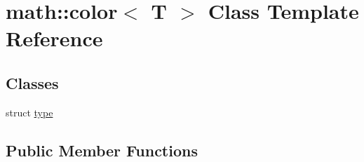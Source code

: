 \hypertarget{classmath_1_1color}{
\section{math::color$<$ T $>$ Class Template Reference}
\label{classmath_1_1color}
}
\subsection*{Classes}
\begin{DoxyCompactItemize}
\item 
struct \hyperlink{structmath_1_1color_1_1type}{type}
\end{DoxyCompactItemize}
\subsection*{Public Member Functions}
